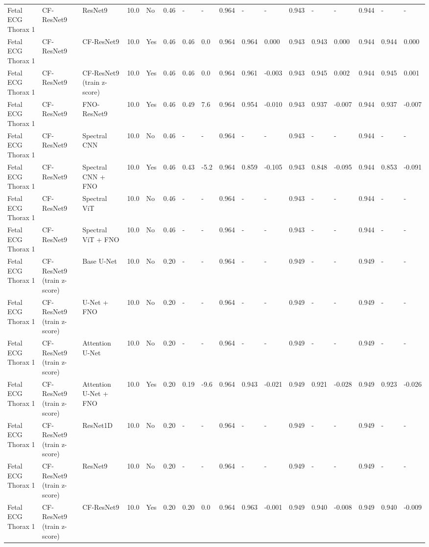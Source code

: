 \begin{longtable}{lllllllllllllllll}
Fetal ECG Thorax 1 & CF-ResNet9 & ResNet9 & 10.0 & No & 0.46 & - & - & 0.964 & - & - & 0.943 & - & - & 0.944 & - & - \\
Fetal ECG Thorax 1 & CF-ResNet9 & CF-ResNet9 & 10.0 & Yes & 0.46 & 0.46 & 0.0 & 0.964 & 0.964 & 0.000 & 0.943 & 0.943 & 0.000 & 0.944 & 0.944 & 0.000 \\
Fetal ECG Thorax 1 & CF-ResNet9 & CF-ResNet9 (train z-score) & 10.0 & Yes & 0.46 & 0.46 & 0.0 & 0.964 & 0.961 & -0.003 & 0.943 & 0.945 & 0.002 & 0.944 & 0.945 & 0.001 \\
Fetal ECG Thorax 1 & CF-ResNet9 & FNO-ResNet9 & 10.0 & Yes & 0.46 & 0.49 & 7.6 & 0.964 & 0.954 & -0.010 & 0.943 & 0.937 & -0.007 & 0.944 & 0.937 & -0.007 \\
Fetal ECG Thorax 1 & CF-ResNet9 & Spectral CNN & 10.0 & No & 0.46 & - & - & 0.964 & - & - & 0.943 & - & - & 0.944 & - & - \\
Fetal ECG Thorax 1 & CF-ResNet9 & Spectral CNN + FNO & 10.0 & Yes & 0.46 & 0.43 & -5.2 & 0.964 & 0.859 & -0.105 & 0.943 & 0.848 & -0.095 & 0.944 & 0.853 & -0.091 \\
Fetal ECG Thorax 1 & CF-ResNet9 & Spectral ViT & 10.0 & No & 0.46 & - & - & 0.964 & - & - & 0.943 & - & - & 0.944 & - & - \\
Fetal ECG Thorax 1 & CF-ResNet9 & Spectral ViT + FNO & 10.0 & No & 0.46 & - & - & 0.964 & - & - & 0.943 & - & - & 0.944 & - & - \\
Fetal ECG Thorax 1 & CF-ResNet9 (train z-score) & Base U-Net & 10.0 & No & 0.20 & - & - & 0.964 & - & - & 0.949 & - & - & 0.949 & - & - \\
Fetal ECG Thorax 1 & CF-ResNet9 (train z-score) & U-Net + FNO & 10.0 & No & 0.20 & - & - & 0.964 & - & - & 0.949 & - & - & 0.949 & - & - \\
Fetal ECG Thorax 1 & CF-ResNet9 (train z-score) & Attention U-Net & 10.0 & No & 0.20 & - & - & 0.964 & - & - & 0.949 & - & - & 0.949 & - & - \\
Fetal ECG Thorax 1 & CF-ResNet9 (train z-score) & Attention U-Net + FNO & 10.0 & Yes & 0.20 & 0.19 & -9.6 & 0.964 & 0.943 & -0.021 & 0.949 & 0.921 & -0.028 & 0.949 & 0.923 & -0.026 \\
Fetal ECG Thorax 1 & CF-ResNet9 (train z-score) & ResNet1D & 10.0 & No & 0.20 & - & - & 0.964 & - & - & 0.949 & - & - & 0.949 & - & - \\
Fetal ECG Thorax 1 & CF-ResNet9 (train z-score) & ResNet9 & 10.0 & No & 0.20 & - & - & 0.964 & - & - & 0.949 & - & - & 0.949 & - & - \\
Fetal ECG Thorax 1 & CF-ResNet9 (train z-score) & CF-ResNet9 & 10.0 & Yes & 0.20 & 0.20 & 0.0 & 0.964 & 0.963 & -0.001 & 0.949 & 0.940 & -0.008 & 0.949 & 0.940 & -0.009 \\

\end{longtable}
